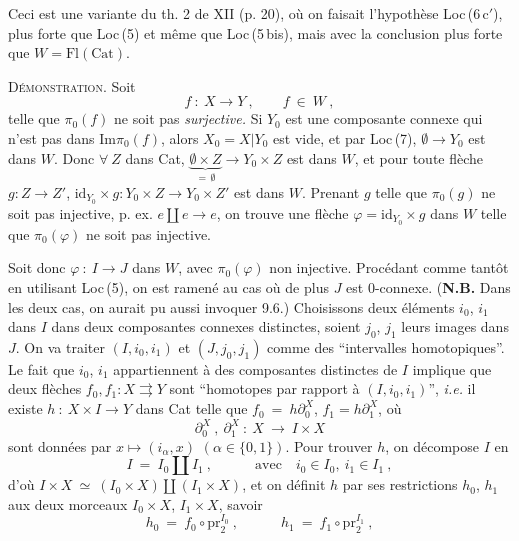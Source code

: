 \documentclass[11pt]{article}
\newcommand{\msp}[1]{\marginpar{\footnotesize [#1]}}
\newcommand{\Cat}{\mathrm{Cat}}
\newcommand{\id}{\mathrm{id}}
\newcommand{\Fl}{\mathrm{Fl}}
\begin{document}
Ceci est une variante du th. 2 de XII (p. 20), où on faisait l'hypothèse Loc\,(6\,c$'$), plus forte que Loc\,(5) et même que Loc\,(5\,bis), mais avec la conclusion plus forte que $W=\Fl(\Cat)$.

\textsc{Démonstration}. Soit
\[
f\ :\ X\longrightarrow Y\ ,\qquad f\ \in\ W\ ,
\]
telle que $\pi_0(f)$ ne soit pas \textit{surjective.} Si $Y_0$ est une composante connexe qui n'est pas dans $\mathrm{Im}\pi_0(f)$, alors $X_0=X|Y_0$ est vide, et par Loc\,(7), $\emptyset\longrightarrow Y_0$ est dans $W$. Donc $\forall\ Z$ dans Cat, %
$\underbrace{\emptyset\times Z}_{=\,\emptyset}\longrightarrow Y_0\times Z$ est dans $W$, et pour toute flèche $g : Z\longrightarrow Z'$, $\id_{Y_0}\times g : Y_0\times Z\longrightarrow Y_0\times Z'$ est dans $W$. Prenant $g$ telle que $\pi_0(g)$ ne soit pas injective, p. ex. $e\amalg e\longrightarrow e$, on trouve une flèche $\varphi=\id_{Y_0}\times g$ dans $W$ telle que $\pi_0(\varphi)$ ne soit pas injective.

\msp{page 127}

Soit donc $\varphi\ :\ I\longrightarrow J$ dans $W$, avec $\pi_0(\varphi)$ non injective. Procédant comme tantôt en utilisant Loc\,(5), on est ramené au cas où de plus $J$ est $0$-connexe. (\textbf{N.B.} Dans les deux cas, on aurait pu aussi invoquer 9.6.) Choisissons deux éléments $i_0$, $i_1$ dans $I$ dans deux composantes connexes distinctes, soient $j_0$, $j_1$ leurs images dans $J$. On va traiter $(I,i_0,i_1)$ et $(J,j_0,j_1)$ comme des “intervalles homotopiques”. Le fait que $i_0$, $i_1$ appartiennent à des composantes distinctes de $I$ implique que deux flèches $f_0,f_1 : X\rightrightarrows Y$ sont “homotopes par rapport à $(I,i_0,i_1)$”, \textit{i.e.} il existe $h\ :\ X\times I\longrightarrow Y$ dans Cat telle que $f_0\ =\ h\partial_0^X$, $f_1=h\partial_1^X$, où
\[
\partial_0^X\ ,\ \partial_1^X\ :\ X\ \longrightarrow\ I\times X
\]
sont données par $x\longmapsto(i_\alpha,x)$ $(\alpha\in\{0,1\})$. Pour trouver $h$, on décompose $I$ en
\[
I\ =\ I_0\amalg I_1\ ,\qquad\quad \text{avec}\quad i_0\in I_0,\ i_1\in I_1\ ,
\]
d'où $I\times X\ \simeq\ (I_0\times X)\amalg(I_1\times X)$, et on définit $h$ par ses restrictions $h_0$, $h_1$ aux deux morceaux $I_0\times X$, $I_1\times X$, savoir
\[
h_0\ =\ f_0\circ\mathrm{pr}_2^{I_0}\ ,\qquad\quad h_1\ =\ f_1\circ\mathrm{pr}_2^{I_1}\ ,
\]
\end{document}
